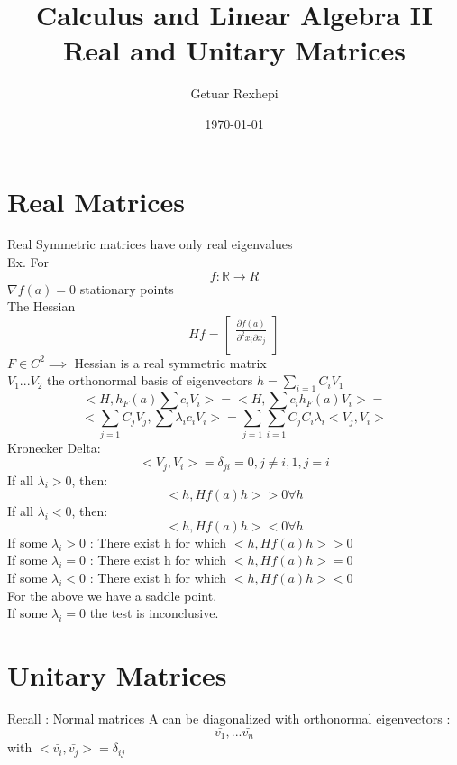 \documentclass{article}
\title{Calculus and Linear Algebra II \\ Real and Unitary Matrices}
\author{Getuar Rexhepi}
\date\today
\begin{document}
\maketitle %


\section {Real Matrices}
Real Symmetric matrices have only real eigenvalues \\

Ex. For \\ $$f: \mathbb{R} \to R$$  $\nabla f(a) = 0$ stationary points\\
The Hessian
$$ Hf = 
\begin{bmatrix}
\frac{\partial f(a)}{\partial^2 x_i \partial x_j} \\
\end{bmatrix}
$$
$ F \in C^2  \implies  $ Hessian is a real symmetric matrix \\
$ V_1 ... V_2 $ the orthonormal basis of eigenvectors $ h = \sum_{i=1} C_i V_1 $ \\
$$ <H, h_F(a)\sum c_i V_i > = <H, \sum c_i h_F(a) V_i > = $$
$$ <\sum_{j=1} C_j V_j , \sum \lambda_i c_i V_i > = \sum_{j=1} \sum_{i=1} C_j C_i \lambda_i <V_j, V_i> $$ 
Kronecker Delta:
$$ <V_j, V_i > = \delta_{ji} = 0 , j \neq i, 1 , j = i $$
If all $ \lambda_i > 0$, then:
$$ < h, Hf(a)h>  >0\forall h$$
If all $ \lambda_i < 0$, then:
$$ < h, Hf(a)h>  <0\forall h$$
If some $\lambda_i >0 $ :
There exist h for which $ < h, Hf(a) h> > 0$ \\
If some $\lambda_i =0 $ :
There exist h for which $ < h, Hf(a) h> = 0$ \\
If some $\lambda_i <0 $ :
There exist h for which $ < h, Hf(a) h> < 0$ \\
For the above we have a saddle point.\\
If some $ \lambda_i = 0 $ the test is inconclusive. 

\section {Unitary Matrices}
Recall : Normal matrices A can be diagonalized with orthonormal eigenvectors : 
$$ \bar{v_1} , ... \bar{v_n}$$ with $< \bar{v_i} ,\bar{v_j} > = \delta_{ij}  $ \\
\end{document}
